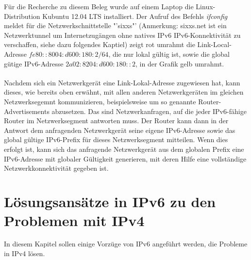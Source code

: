\documentclass[a4paper,12pt]{scrartcl}
\begin{document}
F\"ur die Recherche zu diesem Beleg wurde auf einem Laptop die Linux-Distribution Kubuntu 12.04 LTS installiert. Der Aufruf des Befehls \textit{ifconfig} meldet f\"ur die Netzwerkschnittstelle "'sixxs"' (Anmerkung: sixxs.net ist ein Netzwerktunnel um Internetzug\"angen ohne natives IPv6 IPv6-Konnektivit\"at zu verschaffen, siehe dazu folgendes Kaptiel) zeigt rot umrahmt die Link-Local-Adresse $fe80::8004:d600:180:2/64$, die nur lokal g\"ultig ist, sowie die global g\"utige IPv6-Adresse $2a02:8204:d600:180::2$, in der Grafik gelb umrahmt.\\
\\
Nachdem sich ein Netzwerkger\"at eine Link-Lokal-Adresse zugewiesen hat, kann dieses, wie bereits oben erw\"ahnt, mit allen anderen Netzwerkger\"aten im gleichen Netzwerksegemnt kommunizieren, beispielsweise um so genannte Router-Advertisements abzusetzen. Das sind Netzwerkanfragen, auf die jeder IPv6-f\"ahige Router im Netzwerksegment antworten muss. Der Router kann dann in der Antwort dem anfragenden Netzwerkger\"at seine eigene IPv6-Adresse sowie das global g\"ultige IPv6-Prefix f\"ur dieses Netzwerksegment mitteilen. Wenn dies erfolgt ist, kann sich das anfragende Netzwerkger\"at aus dem globalen Prefix eine IPv6-Adresse mit globaler G\"ultigkeit generieren, mit deren Hilfe eine vollst\"andige Netzwerkkonnektivit\"at gegeben ist. 


\clearpage
\section{L\"osungsans\"atze in IPv6 zu den Problemen mit IPv4}
In diesem Kapitel sollen einige Vorz\"uge von IPv6 angef\"uhrt werden, die Probleme in IPv4 l\"osen.
 
\end{document}
